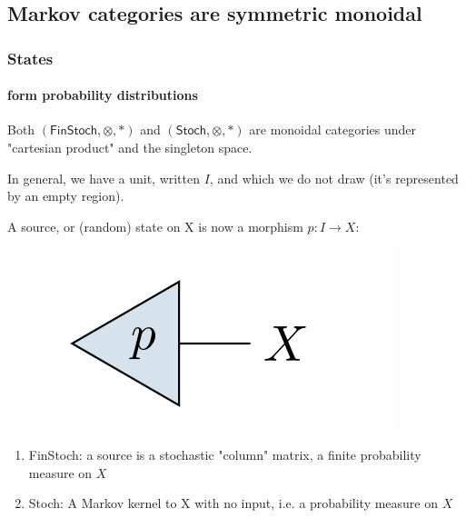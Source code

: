 \subsection{Markov categories are symmetric monoidal}
\begin{frame}
    \frametitle{States}
    \framesubtitle{form probability distributions}
    Both $(\mathsf{FinStoch}, \otimes, *)$ and $(\mathsf{Stoch}, \otimes, *)$ are monoidal categories under "cartesian product" and the singleton space.\par
    In general, we have a unit, written $I$, and which we do not draw (it’s represented by an empty region).\pause

    \begin{minipage}{.55\textwidth}
        A source, or (random) state on X is now a morphism $p: I\to X$: 
    \end{minipage}
    \hfill
    \begin{minipage}{.4\textwidth}
        \includegraphics[width=\textwidth]{graphics/string/markov_state.png}
    \end{minipage}\pause

\begin{enumerate}
    \item FinStoch: a source is a stochastic "column" matrix, a finite probability measure on $X$
    \item Stoch: A Markov kernel to X with no input, i.e. a probability measure on $X$
\end{enumerate}

\end{frame}

